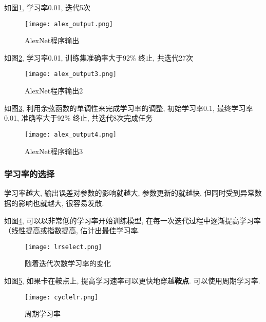 如图\ref{AlexOutput1}, 学习率0.01, 迭代5次
\begin{figure}[!htb]
    \center
\texttt{[image: alex\_output.png]}
\caption{AlexNet程序输出}
\label{AlexOutput1}

\end{figure}
 

如图\ref{AlexOutput2}, 学习率0.01, 训练集准确率大于92\% 终止, 共迭代27次
\begin{figure}[!ht]
    \center
\texttt{[image: alex\_output3.png]}
\caption{AlexNet程序输出2}
\label{AlexOutput2}

\end{figure}

如图\ref{AlexOutput3}, 利用余弦函数的单调性来完成学习率的调整, 初始学习率0.1, 最终学习率0.01, 准确率大于92\% 终止, 共迭代8次完成任务
\begin{figure}[!ht]
    \center
\texttt{[image: alex\_output4.png]}
\caption{AlexNet程序输出3}
\label{AlexOutput3}

\end{figure}

\subsubsection{学习率的选择}

学习率越大, 输出误差对参数的影响就越大, 参数更新的就越快, 但同时受到异常数据的影响也就越大, 很容易发散. 

如图\ref{lrselect}, 可以以非常低的学习率开始训练模型, 在每一次迭代过程中逐渐提高学习率（线性提高或指数提高, 估计出最佳学习率.  

\begin{figure}[!ht]
    \center
\texttt{[image: lrselect.png]}
\caption{随着迭代次数学习率的变化}
\label{lrselect}

\end{figure}


如图\ref{cyclelr}, 如果卡在鞍点上, 提高学习速率可以更快地穿越\textbf{鞍点}. 可以使用周期学习率.
\begin{figure}[!ht]
    \center
\texttt{[image: cyclelr.png]}
\caption{周期学习率}
\label{cyclelr}

\end{figure}
